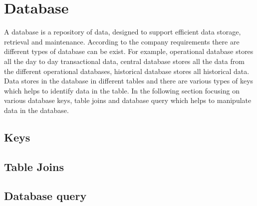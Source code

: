 \chapter{Database}

A database is a repository of data, designed to support efficient data storage, retrieval and maintenance. According to the company requirements there are different types of database can be exist. For example, operational database stores all the day to day transactional data, central database stores all the data from the different operational databases, historical database stores all historical data. Data stores in the database in different tables and  there are various types of keys which helps to identify data in the table. In the following section focusing on various database keys, table joins and database query  which helps to manipulate data in the database. 
\section{Keys}

\section{Table Joins}
\section{Database query}


